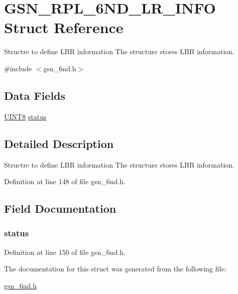 \hypertarget{a00195}{
\section{GSN\_\-RPL\_\-6ND\_\-LR\_\-INFO Struct Reference}
\label{a00195}
}


Structre to define LBR information The structure stores LBR information.  




{\ttfamily \#include $<$gsn\_\-6nd.h$>$}

\subsection*{Data Fields}
\begin{DoxyCompactItemize}
\item 
\hyperlink{a00660_gab27e9918b538ce9d8ca692479b375b6a}{UINT8} \hyperlink{a00195_ac4f6d5d1544a8d2c1309479ffe1b61ab}{status}
\end{DoxyCompactItemize}


\subsection{Detailed Description}
Structre to define LBR information The structure stores LBR information. 

Definition at line 148 of file gsn\_\-6nd.h.



\subsection{Field Documentation}
\hypertarget{a00195_ac4f6d5d1544a8d2c1309479ffe1b61ab}{
\subsubsection[{status}]{ {\bf status}}}
\label{a00195_ac4f6d5d1544a8d2c1309479ffe1b61ab}


Definition at line 150 of file gsn\_\-6nd.h.



The documentation for this struct was generated from the following file:\begin{DoxyCompactItemize}
\item 
\hyperlink{a00473}{gsn\_\-6nd.h}\end{DoxyCompactItemize}
